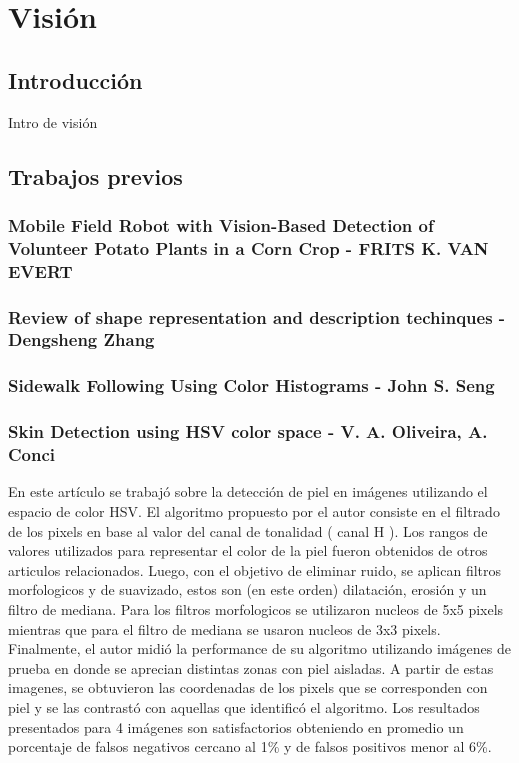 \section{Visi\'on}

\subsection{Introducci\'on}
Intro de visi\'on

\subsection{Trabajos previos}
	\subsubsection{Mobile Field Robot with Vision-Based Detection of Volunteer Potato Plants in a Corn Crop - FRITS K. VAN EVERT}
	\cite{potato}
	\subsubsection{Review of shape representation and description techinques - Dengsheng Zhang}
	\subsubsection{Sidewalk Following Using Color Histograms - John S. Seng}
	\subsubsection{Skin Detection using HSV color space - V. A. Oliveira, A. Conci}
	En este artículo se trabajó sobre la detección de piel en imágenes utilizando el espacio de color HSV. El algoritmo propuesto 
por el autor consiste en el filtrado de los pixels en base al valor del canal de tonalidad ( canal H ). Los rangos de valores utilizados para 
representar el color de la piel fueron obtenidos de otros articulos relacionados. Luego, con el objetivo de eliminar ruido, se aplican filtros morfologicos y de suavizado, estos son (en este orden) dilatación, erosión y un filtro de mediana. Para los filtros morfologicos se utilizaron nucleos de 5x5 pixels mientras que para el filtro de mediana se usaron nucleos de 3x3 pixels. Finalmente, el autor midió la performance de su algoritmo utilizando imágenes de prueba en donde se aprecian distintas zonas con piel aisladas. A partir de estas imagenes, se obtuvieron las coordenadas de los pixels que se corresponden con piel y se las contrastó con aquellas que identificó el algoritmo. Los resultados presentados para 4 imágenes son satisfactorios obteniendo en promedio un porcentaje de falsos negativos cercano al 1\% y de falsos positivos menor al 6\%.

